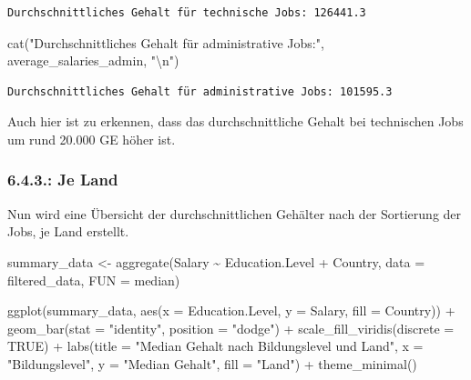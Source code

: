 \documentclass[
  letterpaper,
  DIV=11,
  numbers=noendperiod]{scrartcl}
\newenvironment{Shaded}{\begin{snugshade}}{\end{snugshade}}
\newcommand{\AttributeTok}[1]{\textcolor[rgb]{0.40,0.45,0.13}{#1}}
\newcommand{\ConstantTok}[1]{\textcolor[rgb]{0.56,0.35,0.01}{#1}}
\newcommand{\FunctionTok}[1]{\textcolor[rgb]{0.28,0.35,0.67}{#1}}
\newcommand{\NormalTok}[1]{\textcolor[rgb]{0.00,0.23,0.31}{#1}}
\newcommand{\OtherTok}[1]{\textcolor[rgb]{0.00,0.23,0.31}{#1}}
\newcommand{\SpecialCharTok}[1]{\textcolor[rgb]{0.37,0.37,0.37}{#1}}
\newcommand{\StringTok}[1]{\textcolor[rgb]{0.13,0.47,0.30}{#1}}
\begin{document}
\begin{verbatim}
Durchschnittliches Gehalt für technische Jobs: 126441.3 
\end{verbatim}

\begin{Shaded}
\begin{Highlighting}[]
\FunctionTok{cat}\NormalTok{(}\StringTok{"Durchschnittliches Gehalt für administrative Jobs:"}\NormalTok{, average\_salaries\_admin, }\StringTok{"}\SpecialCharTok{\textbackslash{}n}\StringTok{"}\NormalTok{)}
\end{Highlighting}
\end{Shaded}

\begin{verbatim}
Durchschnittliches Gehalt für administrative Jobs: 101595.3 
\end{verbatim}

Auch hier ist zu erkennen, dass das durchschnittliche Gehalt bei
technischen Jobs um rund 20.000 GE höher ist.

\hypertarget{je-land}{%
\subsubsection{6.4.3.: Je Land}\label{je-land}}

Nun wird eine Übersicht der durchschnittlichen Gehälter nach der
Sortierung der Jobs, je Land erstellt.

\begin{Shaded}
\begin{Highlighting}[]
\NormalTok{summary\_data }\OtherTok{\textless{}{-}} \FunctionTok{aggregate}\NormalTok{(Salary }\SpecialCharTok{\textasciitilde{}}\NormalTok{ Education.Level }\SpecialCharTok{+}\NormalTok{ Country, }\AttributeTok{data =}\NormalTok{ filtered\_data, }\AttributeTok{FUN =}\NormalTok{ median)}

\FunctionTok{ggplot}\NormalTok{(summary\_data, }\FunctionTok{aes}\NormalTok{(}\AttributeTok{x =}\NormalTok{ Education.Level, }\AttributeTok{y =}\NormalTok{ Salary, }\AttributeTok{fill =}\NormalTok{ Country)) }\SpecialCharTok{+}
  \FunctionTok{geom\_bar}\NormalTok{(}\AttributeTok{stat =} \StringTok{"identity"}\NormalTok{, }\AttributeTok{position =} \StringTok{"dodge"}\NormalTok{) }\SpecialCharTok{+}
  \FunctionTok{scale\_fill\_viridis}\NormalTok{(}\AttributeTok{discrete =} \ConstantTok{TRUE}\NormalTok{) }\SpecialCharTok{+}
  \FunctionTok{labs}\NormalTok{(}\AttributeTok{title =} \StringTok{"Median Gehalt nach Bildungslevel und Land"}\NormalTok{, }
       \AttributeTok{x =} \StringTok{"Bildungslevel"}\NormalTok{,}
       \AttributeTok{y =} \StringTok{"Median Gehalt"}\NormalTok{,}
       \AttributeTok{fill =} \StringTok{"Land"}\NormalTok{) }\SpecialCharTok{+}
  \FunctionTok{theme\_minimal}\NormalTok{()}
\end{Highlighting}
\end{Shaded}
\end{document}
